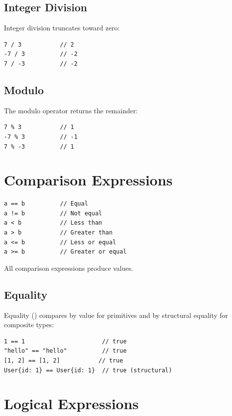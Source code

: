 \subsection{Integer Division}

Integer division truncates toward zero:

\begin{lstlisting}
7 / 3           // 2
-7 / 3          // -2
7 / -3          // -2
\end{lstlisting}

\subsection{Modulo}

The modulo operator returns the remainder:

\begin{lstlisting}
7 % 3           // 1
-7 % 3          // -1
7 % -3          // 1
\end{lstlisting}

\section{Comparison Expressions}

\begin{lstlisting}
a == b          // Equal
a != b          // Not equal
a < b           // Less than
a > b           // Greater than
a <= b          // Less or equal
a >= b          // Greater or equal
\end{lstlisting}

All comparison expressions produce  values.

\subsection{Equality}

Equality (\code{==}) compares by value for primitives and by structural equality for composite types:

\begin{lstlisting}
1 == 1                      // true
"hello" == "hello"          // true
[1, 2] == [1, 2]           // true
User{id: 1} == User{id: 1}  // true (structural)
\end{lstlisting}

\section{Logical Expressions}

